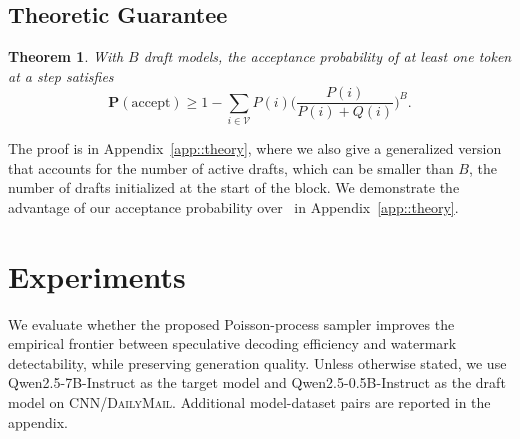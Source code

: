 \documentclass{article}
\theoremstyle{plain}
\newtheorem{theorem}{Theorem}[section]
\theoremstyle{definition}
\begin{document}
\subsection{Theoretic Guarantee}
\label{subsec::MPFR_theory}
\begin{theorem}
    \label{thm::PML_accept}
    With $B$ draft models, the acceptance probability of at least one token at a step satisfies 
    \begin{equation}
        \label{eq::PML_accept}
        \mathbf{P}(\mathrm{accept}) \geq 
        1-\sum_{i\in\mathcal{V}} P(i)\Big(\frac{P(i)}{P(i) + Q(i)}\Big)^B. 
    \end{equation}
\end{theorem}
The proof is in Appendix~\ref{app::theory}, where we also give 
a generalized version that accounts for the number of active drafts, which %
can be smaller than $B$, the number of drafts initialized at the start of the block. 
We demonstrate the advantage of our acceptance probability over~\citep{rowan2025list} in Appendix~\ref{app::theory}. 





\section{Experiments}
\label{sec::experiments}

We evaluate whether the proposed Poisson-process sampler improves the empirical
frontier between speculative decoding efficiency and watermark detectability, while
preserving generation quality. Unless otherwise stated, we use Qwen2.5-7B-Instruct as
the target model and Qwen2.5-0.5B-Instruct as the draft model on
\textsc{CNN/DailyMail}. Additional model-dataset pairs are reported in the appendix.
\end{document}
